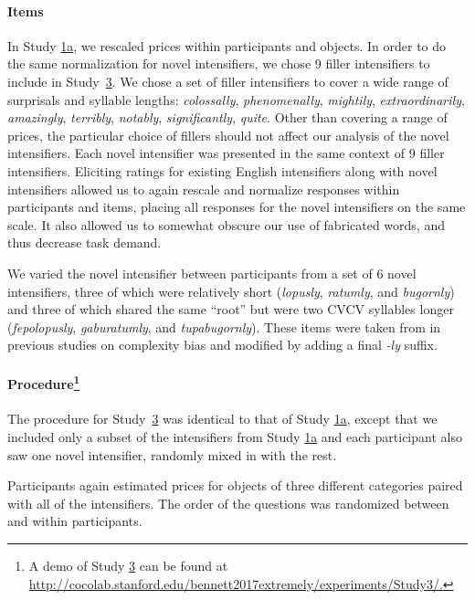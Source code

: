 \documentclass[10pt,letterpaper]{article}
\newcommand{\w}[1]{\emph{#1}}
\begin{document}
\paragraph{Items}

In Study \hyperref[sec:study1a]{1a}, we rescaled prices within participants and objects.
In order to do the same normalization for novel intensifiers, we chose 9 filler intensifiers to include in Study~\hyperref[sec:study3]{3}.
We chose a set of filler intensifiers to cover a wide range of surprisals and syllable lengths: \w{colossally}, \w{phenomenally}, \w{mightily}, \w{extraordinarily}, \w{amazingly}, \w{terribly}, \w{notably}, \w{significantly}, \w{quite}.
Other than covering a range of prices, the particular choice of fillers should not affect our analysis of the novel intensifiers.
Each novel intensifier was presented in the same context of 9 filler intensifiers.
Eliciting ratings for existing English intensifiers along with novel intensifiers allowed us to again rescale and normalize responses within participants and items, placing all responses for the novel intensifiers on the same scale.
It also allowed us to somewhat obscure our use of fabricated words, and thus decrease task demand.

We varied the novel intensifier between participants from a set of 6 novel intensifiers, three of which were relatively short (\w{lopusly}, \w{ratumly}, and \w{bugornly}) and three of which shared the same ``root'' but were two CVCV syllables longer (\w{fepolopusly}, \w{gaburatumly}, and \w{tupabugornly}).
These items were taken from in previous studies on complexity bias \cite{lewis_conceptual_2016} and modified by adding a final \w{-ly} suffix.

\paragraph{Procedure\footnote{A demo of Study \hyperref[sec:study3]{3} can be found at \url{http://cocolab.stanford.edu/bennett2017extremely/experiments/Study3/.}}}

The procedure for Study~\hyperref[sec:study3]{3} was identical to that of Study \hyperref[sec:study1a]{1a}, except that we included only a subset of the intensifiers from Study \hyperref[sec:study1a]{1a} and each participant also saw one novel intensifier, randomly mixed in with the rest.

Participants again estimated prices for objects of three different categories paired with all of the intensifiers.
The order of the questions was randomized between and within participants.
\end{document}
